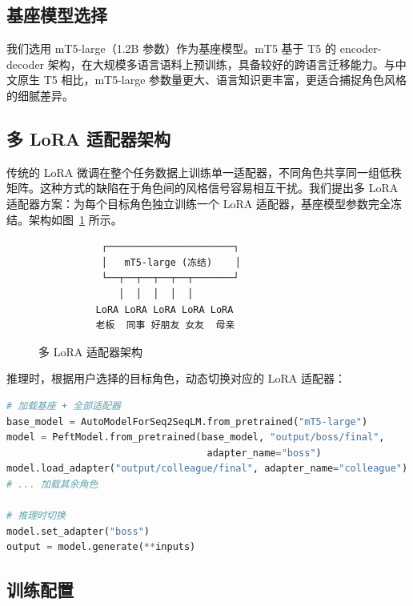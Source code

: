 \documentclass[12pt,a4paper]{article}
\begin{document}
\subsection{基座模型选择}

我们选用 mT5-large\cite{xue2021mt5}（1.2B 参数）作为基座模型。mT5 基于 T5 的 encoder-decoder 架构，在大规模多语言语料上预训练，具备较好的跨语言迁移能力。与中文原生 T5 相比，mT5-large 参数量更大、语言知识更丰富，更适合捕捉角色风格的细腻差异。

\subsection{多 LoRA 适配器架构}

传统的 LoRA 微调在整个任务数据上训练单一适配器，不同角色共享同一组低秩矩阵。这种方式的缺陷在于角色间的风格信号容易相互干扰。我们提出多 LoRA 适配器方案：为每个目标角色独立训练一个 LoRA 适配器，基座模型参数完全冻结。架构如图~\ref{fig:architecture} 所示。

\begin{figure}[H]
\centering
\begin{verbatim}
           ┌──────────────────────┐
           │   mT5-large (冻结)    │
           └──┬──┬──┬──┬──┬───────┘
              │  │  │  │  │
          LoRA LoRA LoRA LoRA LoRA
          老板  同事 好朋友 女友  母亲
\end{verbatim}
\caption{多 LoRA 适配器架构}
\label{fig:architecture}
\end{figure}

推理时，根据用户选择的目标角色，动态切换对应的 LoRA 适配器：

\begin{lstlisting}[language=Python]
# 加载基座 + 全部适配器
base_model = AutoModelForSeq2SeqLM.from_pretrained("mT5-large")
model = PeftModel.from_pretrained(base_model, "output/boss/final",
                                   adapter_name="boss")
model.load_adapter("output/colleague/final", adapter_name="colleague")
# ... 加载其余角色

# 推理时切换
model.set_adapter("boss")
output = model.generate(**inputs)
\end{lstlisting}

\subsection{训练配置}
\end{document}
